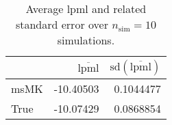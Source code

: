 \begin{table}[H]

\caption{Average lpml and related standard error over $n_{\text{sim}} = 10$ simulations.}
\centering
\begin{tabular}[t]{lrr}
\toprule
  & $\overbar{\text{lpml}}$ & $\text{sd}(\overbar{\text{lpml}})$\\
\midrule
msMK & -10.40503 & 0.1044477\\
True & -10.07429 & 0.0868854\\
\bottomrule
\end{tabular}
\end{table}